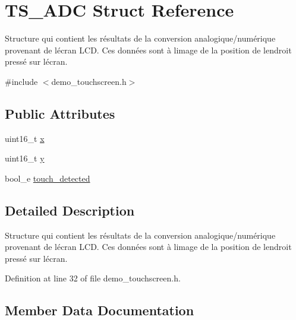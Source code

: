 \hypertarget{struct_t_s___a_d_c}{}\section{T\+S\+\_\+\+A\+D\+C Struct Reference}
\label{struct_t_s___a_d_c}


Structure qui contient les résultats de la conversion analogique/numérique provenant de l\textquotesingle{}écran L\+C\+D. Ces données sont à l\textquotesingle{}image de la position de l\textquotesingle{}endroit pressé sur l\textquotesingle{}écran.  




{\ttfamily \#include $<$demo\+\_\+touchscreen.\+h$>$}

\subsection*{Public Attributes}
\begin{DoxyCompactItemize}
\item 
uint16\+\_\+t \hyperlink{struct_t_s___a_d_c_a311aec5e5bdf585b941745fd47c2df7b}{x}
\item 
uint16\+\_\+t \hyperlink{struct_t_s___a_d_c_ac7140c8f07941dab74d24d255c5254d3}{y}
\item 
bool\+\_\+e \hyperlink{struct_t_s___a_d_c_a19bcc0c50842ce9f91c3ff70a0379ad9}{touch\+\_\+detected}
\end{DoxyCompactItemize}


\subsection{Detailed Description}
Structure qui contient les résultats de la conversion analogique/numérique provenant de l\textquotesingle{}écran L\+C\+D. Ces données sont à l\textquotesingle{}image de la position de l\textquotesingle{}endroit pressé sur l\textquotesingle{}écran. 

Definition at line 32 of file demo\+\_\+touchscreen.\+h.



\subsection{Member Data Documentation}
\hypertarget{struct_t_s___a_d_c_a19bcc0c50842ce9f91c3ff70a0379ad9}{}
